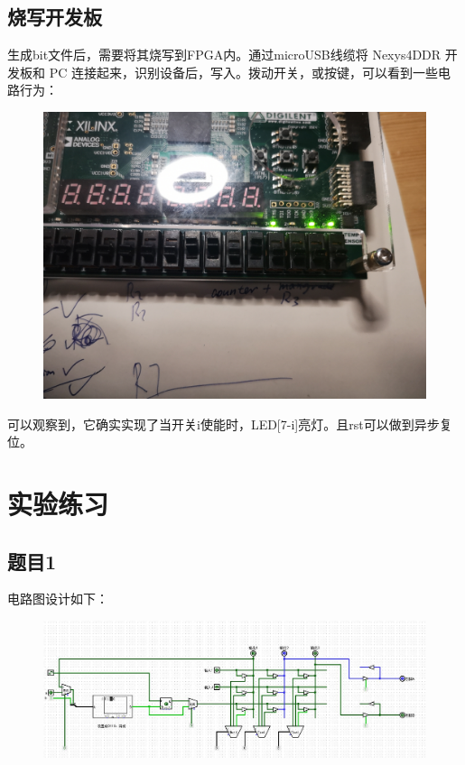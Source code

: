 \documentclass[UTF8]{article}
\begin{document}
	\subsection{烧写开发板}
	生成bit文件后，需要将其烧写到FPGA内。通过microUSB线缆将 Nexys4DDR 开发板和 PC 连接起来，识别设备后，写入。拨动开关，或按键，可以看到一些电路行为：\par
	\begin{figure}[H]
		\centering
		\includegraphics[width=1\linewidth]{s6.jpg}
		\label{s6}
	\end{figure}\par
	可以观察到，它确实实现了当开关i使能时，LED[7-i]亮灯。且rst可以做到异步复位。
	
	\section{实验练习}	
	\subsection{题目1}
	电路图设计如下：
	\begin{figure}[H]
		\centering
		\includegraphics[width=1\linewidth]{e1.jpg}
		\label{e1}
	\end{figure}
\end{document}

